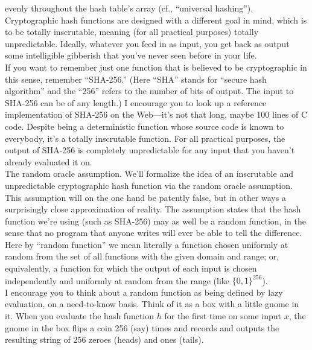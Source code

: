 evenly throughout the hash table’s array (cf., “universal hashing”).\\
Cryptographic hash functions are designed with a different goal in mind, which is to
be totally inscrutable, meaning (for all practical purposes) totally unpredictable. Ideally,
whatever you feed in as input, you get back as output some intelligible gibberish that you’ve
never seen before in your life.\\
If you want to remember just one function that is believed to be cryptographic in this
sense, remember “SHA-256.” (Here “SHA” stands for “secure hash algorithm” and the
“256” refers to the number of bits of output. The input to SHA-256 can be of any length.)
I encourage you to look up a reference implementation of SHA-256 on the Web—it’s not
that long, maybe 100 lines of C code. Despite being a deterministic function whose source
code is known to everybody, it’s a totally inscrutable function. For all practical purposes,
the output of SHA-256 is completely unpredictable for any input that you haven’t already
evaluated it on.\\

\noindent
The random oracle assumption. We’ll formalize the idea of an inscrutable and unpredictable cryptographic hash function via the random oracle assumption. This assumption
will on the one hand be patently false, but in other ways a surprisingly close approximation
of reality. The assumption states that the hash function we’re using (such as SHA-256)
may as well be a random function, in the sense that no program that anyone writes will
ever be able to tell the difference. Here by “random function” we mean literally a function
chosen uniformly at random from the set of all functions with the given domain and range;
or, equivalently, a function for which the output of each input is chosen independently and
uniformly at random from the range (like $\{0, 1\}^{256}$).\\
I encourage you to think about a random function as being defined by lazy evaluation,
on a need-to-know basis. Think of it as a box with a little gnome in it. When you evaluate
the hash function $h$ for the first time on some input $x$, the gnome in the box flips a coin
256 (say) times and records and outputs the resulting string of 256 zeroes (heads) and ones
(tails).\\

